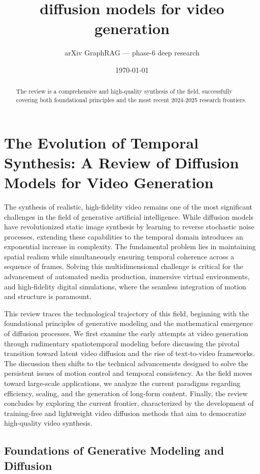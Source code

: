 \documentclass[11pt]{article}
\title{diffusion models for video generation}
\author{arXiv GraphRAG --- phase-6 deep research}
\date{\today}
\begin{document}
\maketitle

\begin{abstract}
The review is a comprehensive and high-quality synthesis of the field, successfully covering both foundational principles and the most recent 2024-2025 research frontiers.
\end{abstract}

\section{The Evolution of Temporal Synthesis: A Review of Diffusion Models for Video Generation}

The synthesis of realistic, high-fidelity video remains one of the most significant challenges in the field of generative artificial intelligence. While diffusion models have revolutionized static image synthesis by learning to reverse stochastic noise processes, extending these capabilities to the temporal domain introduces an exponential increase in complexity. The fundamental problem lies in maintaining spatial realism while simultaneously ensuring temporal coherence across a sequence of frames. Solving this multidimensional challenge is critical for the advancement of automated media production, immersive virtual environments, and high-fidelity digital simulations, where the seamless integration of motion and structure is paramount.

This review traces the technological trajectory of this field, beginning with the foundational principles of generative modeling and the mathematical emergence of diffusion processes. We first examine the early attempts at video generation through rudimentary spatiotemporal modeling before discussing the pivotal transition toward latent video diffusion and the rise of text-to-video frameworks. The discussion then shifts to the technical advancements designed to solve the persistent issues of motion control and temporal consistency. As the field moves toward large-scale applications, we analyze the current paradigms regarding efficiency, scaling, and the generation of long-form content. Finally, the review concludes by exploring the current frontier, characterized by the development of training-free and lightweight video diffusion methods that aim to democratize high-quality video synthesis.

\subsection{Foundations of Generative Modeling and Diffusion}
\end{document}
